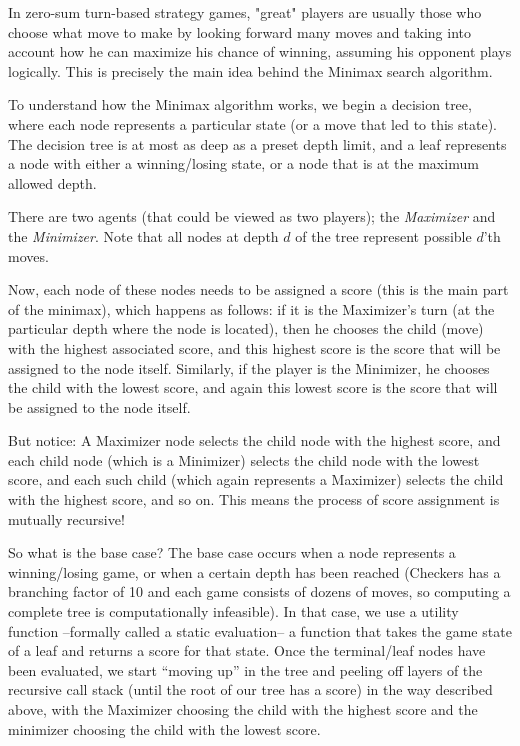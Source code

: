 \documentclass[fontsize=11pt]{article}
\begin{document}
In zero-sum turn-based strategy games, "great" players are usually those who choose what move to make by looking forward many moves and taking into account how he can maximize his chance of winning, assuming his opponent plays logically. This is precisely the main idea behind the Minimax search algorithm.

To understand how the Minimax algorithm works, we begin a decision tree, where each node represents a particular state (or a move that led to this state). The decision tree is at most as deep as a preset depth limit, and a leaf represents a node with either a winning/losing state, or a node that is at the maximum allowed depth.

There are two agents (that could be viewed as two players); the \textit{Maximizer} and the \textit{Minimizer}. Note that all 
nodes at depth $d$ of the tree represent possible $d$'th moves.

Now, each node of these nodes needs to be assigned a score (this is the main part of the minimax), which happens as follows: if it is the Maximizer's turn (at the particular depth where the node is located), then he chooses the child (move) with the highest associated score, and this highest score is the score that will be assigned to the node itself. Similarly, if the player is the Minimizer, he chooses the child with the lowest score, and again this lowest score is the score that will be assigned to the node itself. 

But notice: A Maximizer node selects the child node with the highest score, and each child node (which is a Minimizer) selects the child node with the lowest score, and each such child (which again represents a Maximizer) selects the child with the highest score, and so on. This means the process of score assignment is mutually recursive! 

So what is the base case? The base case occurs when a node represents a winning/losing game, or when a certain depth has been reached (Checkers has a branching factor of 10 and each game consists of dozens of moves, so computing a complete tree is computationally infeasible). In that case, we use a utility function --formally called a static evaluation-- a function that takes the game state of a leaf and returns a score for that state. Once the terminal/leaf nodes have been evaluated, we start “moving up” in the tree and peeling off layers of the recursive call stack (until the root of our tree has a score) in the way described above, with the Maximizer choosing the child with the highest score and the minimizer choosing the child with the lowest score.
\end{document}
